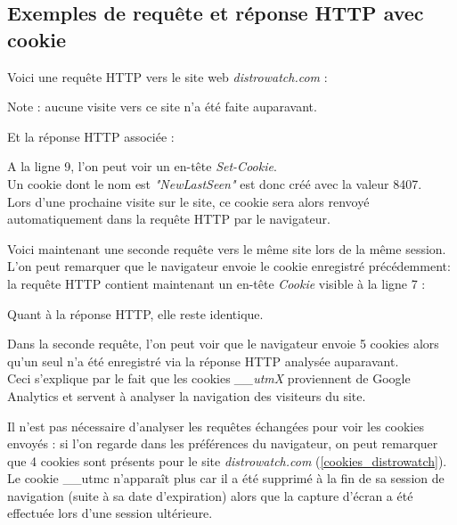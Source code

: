 \subsection{Exemples de requête et réponse HTTP avec cookie}
\label{http-request-example}
Voici une requête HTTP vers le site web \textit{distrowatch.com} :

Note : aucune visite vers ce site n'a été faite auparavant.
\newpage

Et la réponse HTTP associée :

A la ligne 9, l'on peut voir un en-tête \textit{Set-Cookie}.\\
Un cookie dont le nom est \textit{"NewLastSeen"} est donc créé avec la valeur 8407.\\
Lors d'une prochaine visite sur le site, ce cookie sera alors renvoyé automatiquement dans la requête HTTP par le navigateur.
\newline

Voici maintenant une seconde requête vers le même site lors de la même session.
L'on peut remarquer que le navigateur envoie le cookie enregistré précédemment: la requête HTTP contient maintenant un en-tête \textit{Cookie} visible à la ligne 7 :


Quant à la réponse HTTP, elle reste identique.
\newline

Dans la seconde requête, l'on peut voir que le navigateur envoie 5 cookies alors qu'un seul n'a été enregistré via la réponse HTTP analysée auparavant.\\
Ceci s'explique par le fait que les cookies \textit{\_\_utmX} proviennent de Google Analytics \cite{Google_Analytics_cookies} et servent à analyser la navigation des visiteurs du site.
\newline

Il n'est pas nécessaire d'analyser les requêtes échangées pour voir les cookies envoyés : si l'on regarde dans les préférences du navigateur, on peut remarquer que 4 cookies sont présents pour le site \textit{distrowatch.com} (\autoref{cookies_distrowatch}).
Le cookie \_\_utmc n'apparaît plus car il a été supprimé à la fin de sa session de navigation (suite à sa date d'expiration) alors que la capture d'écran a été effectuée lors d'une session ultérieure.

